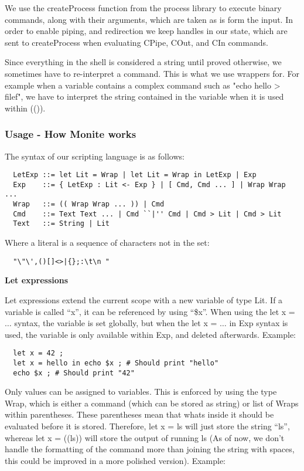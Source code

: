 \documentclass[11pt,a4paper]{article}
\begin{document}
We use the createProcess function from the process library to execute binary
commands, along with their arguments, which are taken as is form the input. In
order to enable piping, and redirection we keep handles in our state, which are
sent to createProcess when evaluating CPipe, COut, and CIn commands.

Since everything in the shell is considered a string until proved otherwise, we
sometimes have to re-interpret a command. This is what we use wrappers for.  For
example when a variable contains a complex command such as "echo hello > filef",
we have to interpret the string contained in the variable when it is used within
(()).

\subsubsection{Usage - How Monite works}
\label{features}
The syntax of our scripting language is as follows:

\begin{verbatim}
  LetExp ::= let Lit = Wrap | let Lit = Wrap in LetExp | Exp
  Exp    ::= { LetExp : Lit <- Exp } | [ Cmd, Cmd ... ] | Wrap Wrap ...
  Wrap   ::= (( Wrap Wrap ... )) | Cmd
  Cmd    ::= Text Text ... | Cmd ``|'' Cmd | Cmd > Lit | Cmd > Lit
  Text   ::= String | Lit
\end{verbatim}

Where a literal is a sequence of characters not in the set:
\begin{verbatim}
  "\"\',()[]<>|{};:\t\n "
\end{verbatim}

\textbf{Let expressions}

Let expressions extend the current scope with a new variable of type Lit. If a
variable is called ``x'', it can be referenced by using ``\$x''.  When using the
let x = $\dots$ syntax, the variable is set globally, but when the let x =
$\dots$ in Exp syntax is used, the variable is only available within Exp, and
deleted afterwards. Example:

\begin{verbatim}
  let x = 42 ;
  let x = hello in echo $x ; # Should print "hello"
  echo $x ; # Should print "42"
\end{verbatim}

Only values can be assigned to variables. This is enforced by using the type
Wrap, which is either a command (which can be stored as string) or list of
Wraps within parentheses. These parentheses mean that whats inside it should be
evaluated before it is stored. Therefore, let x = ls will just store the string
``ls'', whereas let x = ((ls)) will store the output of running ls (As of now,
we don't handle the formatting of the command more than joining the string with
spaces, this could be improved in a more polished version). Example:
\end{document}

